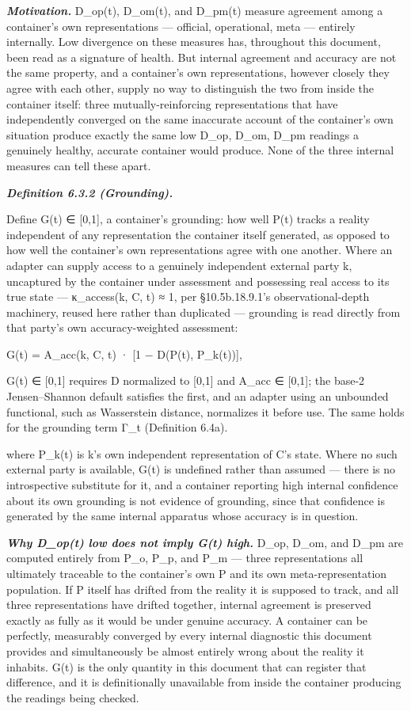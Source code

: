 \documentclass[
]{article}
\begin{document}
\emph{\textbf{Motivation.}} D\_op(t), D\_om(t), and D\_pm(t) measure
agreement among a container's own representations --- official,
operational, meta --- entirely internally. Low divergence on these
measures has, throughout this document, been read as a signature of
health. But internal agreement and accuracy are not the same property,
and a container's own representations, however closely they agree with
each other, supply no way to distinguish the two from inside the
container itself: three mutually-reinforcing representations that have
independently converged on the same inaccurate account of the
container's own situation produce exactly the same low D\_op, D\_om,
D\_pm readings a genuinely healthy, accurate container would produce.
None of the three internal measures can tell these apart.

\emph{\textbf{Definition 6.3.2 (Grounding).}}

Define G(t) ∈ {[}0,1{]}, a container's grounding: how well P(t) tracks a
reality independent of any representation the container itself
generated, as opposed to how well the container's own representations
agree with one another. Where an adapter can supply access to a
genuinely independent external party k, uncaptured by the container
under assessment and possessing real access to its true state ---
κ\_access(k, C, t) ≈ 1, per §10.5b.18.9.1's observational-depth
machinery, reused here rather than duplicated --- grounding is read
directly from that party's own accuracy-weighted assessment:

G(t) = A\_acc(k, C, t) · {[}1 − D(P(t), P\_k(t)){]},

G(t) ∈ {[}0,1{]} requires D normalized to {[}0,1{]} and A\_acc ∈
{[}0,1{]}; the base-2 Jensen--Shannon default satisfies the first, and
an adapter using an unbounded functional, such as Wasserstein distance,
normalizes it before use. The same holds for the grounding term Γ\_t
(Definition 6.4a).

where P\_k(t) is k's own independent representation of C's state. Where
no such external party is available, G(t) is undefined rather than
assumed --- there is no introspective substitute for it, and a container
reporting high internal confidence about its own grounding is not
evidence of grounding, since that confidence is generated by the same
internal apparatus whose accuracy is in question.

\emph{\textbf{Why D\_op(t) low does not imply G(t) high.}} D\_op, D\_om,
and D\_pm are computed entirely from P\_o, P\_p, and P\_m --- three
representations all ultimately traceable to the container's own P and
its own meta-representation population. If P itself has drifted from the
reality it is supposed to track, and all three representations have
drifted together, internal agreement is preserved exactly as fully as it
would be under genuine accuracy. A container can be perfectly,
measurably converged by every internal diagnostic this document provides
and simultaneously be almost entirely wrong about the reality it
inhabits. G(t) is the only quantity in this document that can register
that difference, and it is definitionally unavailable from inside the
container producing the readings being checked.
\end{document}
